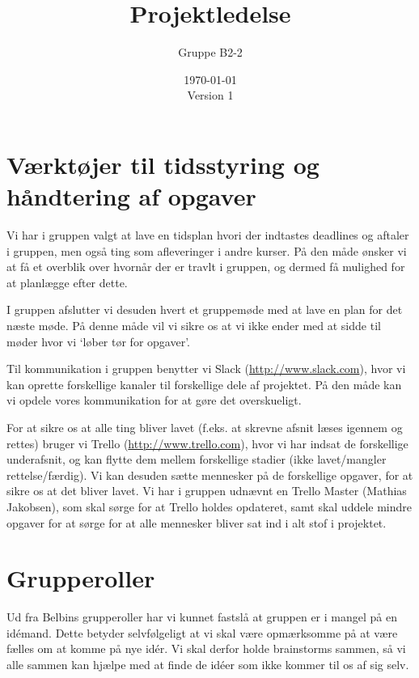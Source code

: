 \documentclass[hidelinks, 12pt]{article}
\newcommand{\group}{B2-2}
\begin{document}
	
	\title{Projektledelse}
	\author{Gruppe \group}
	\date{\today \\\vspace{0.5cm} Version 1}
	\maketitle
	
	\section*{Værktøjer til tidsstyring og håndtering af opgaver}
	Vi har i gruppen valgt at lave en tidsplan hvori der indtastes deadlines og aftaler i gruppen, men også ting som afleveringer i andre kurser. På den måde ønsker vi at få et overblik over hvornår der er travlt i gruppen, og dermed få mulighed for at planlægge efter dette.

	I gruppen afslutter vi desuden hvert et gruppemøde med at lave en plan for det næste møde. På denne måde vil vi sikre os at vi ikke ender med at sidde til møder hvor vi `løber tør for opgaver'.

	Til kommunikation i gruppen benytter vi Slack (\url{http://www.slack.com}), hvor vi kan oprette forskellige kanaler til forskellige dele af projektet. På den måde kan vi opdele vores kommunikation for at gøre det overskueligt. 

	For at sikre os at alle ting bliver lavet (f.eks. at skrevne afsnit læses igennem og rettes) bruger vi Trello (\url{http://www.trello.com}), hvor vi har indsat de forskellige underafsnit, og kan flytte dem mellem forskellige stadier (ikke lavet/mangler rettelse/færdig). Vi kan desuden sætte mennesker på de forskellige opgaver, for at sikre os at det bliver lavet. Vi har i gruppen udnævnt en Trello Master (Mathias Jakobsen), som skal sørge for at Trello holdes opdateret, samt skal uddele mindre opgaver for at sørge for at alle mennesker bliver sat ind i alt stof i projektet.

	\section*{Grupperoller}
	Ud fra Belbins grupperoller har vi kunnet fastslå at gruppen er i mangel på en id\'emand. Dette betyder selvfølgeligt at vi skal være opmærksomme på at være fælles om at komme på nye id\'er. Vi skal derfor holde brainstorms sammen, så vi alle sammen kan hjælpe med at finde de id\'eer som ikke kommer til os af sig selv.
\end{document}
